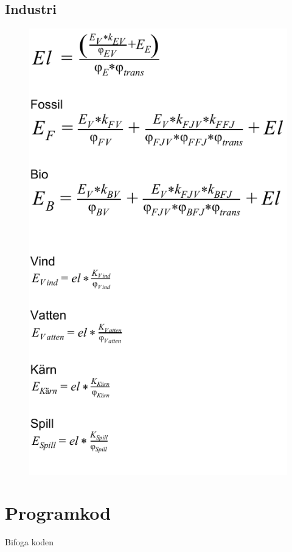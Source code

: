 \documentclass[a4paper,11pt,fleqn, titlepage]{article}
\begin{document}
\subsection{Industri}
\begin{figure}[h!]
	\centering 
 		\includegraphics[scale = 0.75]{industri2.pdf}
		\label{diagram}
\end{figure}
\section{Programkod}
Bifoga koden
\end{document}
